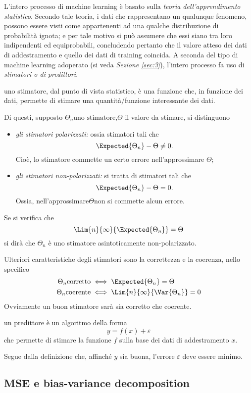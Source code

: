 \documentclass{subfiles}
\begin{document}
\label{sec:2}
L'intero processo di machine learning è basato sulla \emph{teoria dell'apprendimento statistico}.
Secondo tale teoria, i dati che rappresentano un qualunque fenomeno, possono essere visti come appartenenti ad una qualche distribuzione di probabilità ignota;
e per tale motivo si può assumere che essi siano tra loro indipendenti ed equiprobabili,
concludendo pertanto che il valore atteso dei dati di addestramento e quello dei dati di training coincida.
A seconda del tipo di machine learning adoperato (si veda \emph{Sezione \ref{sec:3}}), l'intero processo fa uso di \emph{stimatori \emph{o di} predittori}.
\begin{Definition*}
    uno stimatore, dal punto di vista statistico, è una funzione che, in funzione dei dati, permette di stimare una quantità/funzione interessante dei dati.
\end{Definition*}
Di questi, supposto \(\Theta_{n} \text{uno stimatore,} \Theta\) il valore da stimare, si distinguono
\begin{itemize}
    \item \emph{gli stimatori polarizzati:} ossia stimatori tali che
          \[
              \Expected{\Theta_{n}} - \Theta \neq 0.
          \]
          Cioè, lo stimatore commette un certo errore nell'approssimare \(\Theta\);

    \item \emph{gli stimatori non-polarizzati:} si tratta di stimatori tali che
          \[
              \Expected{\Theta_{n}} - \Theta = 0.
          \]
          Ossia, nell'approssimare\(\Theta\)non si commette alcun errore.
\end{itemize}
\begin{Remark*}
    Se si verifica che
    \[
        \Lim{n}{\infty}{\Expected{\Theta_{n}}} = \Theta
    \]
    si dirà che \(\Theta_{n}\) è uno stimatore asintoticamente non-polarizzato.
\end{Remark*}
Ulteriori caratteristiche degli stimatori sono la correttezza e la coerenza, nello specifico
\[\begin{aligned}
        \Theta_{n} \text{corretto} & \iff \Expected{\Theta_{n}} = \Theta        \\
        \Theta_{n} \text{coerente} & \iff \Lim{n}{\infty}{\Var{\Theta_{n}}} = 0
    \end{aligned}\]
Ovviamente un buon stimatore sarà sia corretto che coerente.
\begin{Definition*}
    un predittore è un algoritmo della forma
    \[
        y = f(x) + \varepsilon
    \]
    che permette di stimare la funzione \(f\) sulla base dei dati di addestramento \(x\).
\end{Definition*}
Segue dalla definizione che, affinché \(y\) sia buona, l'errore \(\varepsilon\) deve essere minimo.
\clearpage

\subsection{MSE e bias-variance decomposition}

\clearpage
\end{document}
